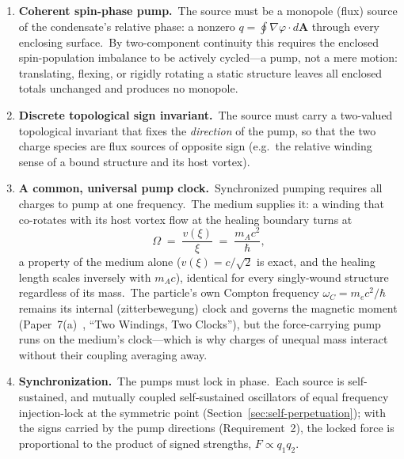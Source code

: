 ﻿\documentclass[12pt,letterpaper]{article}
\begin{document}
\begin{enumerate}[leftmargin=2em]
  \item \textbf{Coherent spin-phase pump.}\ The source must be a monopole
    (flux) source of the condensate's relative phase: a nonzero
    $q = \oint \nabla\varphi \cdot d\mathbf{A}$ through every enclosing
    surface.\ By two-component continuity this requires the enclosed
    spin-population imbalance to be actively cycled---a pump, not a mere
    motion: translating, flexing, or rigidly rotating a static structure
    leaves all enclosed totals unchanged and produces no monopole.

  \item \textbf{Discrete topological sign invariant.}\ The source must carry
    a two-valued topological invariant that fixes the \emph{direction} of
    the pump, so that the two charge species are flux sources of opposite
    sign (e.g.\ the relative winding sense of a bound structure and its
    host vortex).

  \item \textbf{A common, universal pump clock.}\ Synchronized pumping
    requires all charges to pump at one frequency.\ The medium supplies it:
    a winding that co-rotates with its host vortex flow at the healing
    boundary turns at
    \begin{equation}
      \Omega \;=\; \frac{v(\xi)}{\xi} \;=\; \frac{m_A c^2}{\hbar},
      \label{eq:pump-clock-p4}
    \end{equation}
    a property of the medium alone ($v(\xi) = c/\sqrt{2}$ is exact, and the
    healing length scales inversely with $m_A c$), identical for every
    singly-wound structure regardless of its mass.\ The particle's own
    Compton frequency $\omega_C = m_e c^2/\hbar$ remains its internal
    (zitterbewegung) clock and governs the magnetic moment
    (Paper~7(a)~\cite{otto-boundcore}, ``Two Windings, Two Clocks''), but
    the force-carrying pump runs on the medium's clock---which is why
    charges of unequal mass interact without their coupling averaging
    away.

  \item \textbf{Synchronization.}\ The pumps must lock in phase.\ Each
    source is self-sustained, and mutually coupled self-sustained
    oscillators of equal frequency injection-lock at the symmetric point
    (Section~\ref{sec:self-perpetuation}); with the signs carried by the
    pump directions (Requirement~2), the locked force is proportional to
    the product of signed strengths, $F \propto q_1 q_2$.
\end{enumerate}
\end{document}
